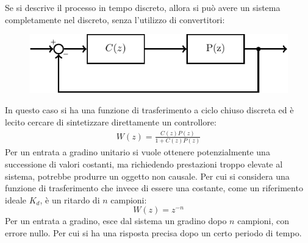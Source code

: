 \documentclass{article}
\numberwithin{equation}{subsection}
\begin{document}
Se si descrive il processo in tempo discreto, allora si può avere un sistema completamente nel discreto, senza l'utilizzo di convertitori:
\begin{figure}[H]%
    \centering
    \includegraphics{sistema-discreto-3.pdf}%
\end{figure}
In questo caso si ha una funzione di trasferimento a ciclo chiuso discreta ed è lecito cercare di sintetizzare direttamente un controllore:
\begin{gather*}
    W(z)=\displaystyle\frac{C(z)P(z)}{1+C(z)P(z)}
\end{gather*}
Per un entrata a gradino unitario si vuole ottenere potenzialmente una successione di valori costanti, ma richiedendo prestazioni troppo elevate al sistema, 
potrebbe produrre un oggetto non causale. 
Per cui si considera una funzione di trasferimento che invece di essere una costante, come un riferimento ideale $K_d$, è un ritardo di $n$ 
campioni:
\begin{equation*}
    W(z)=z^{-n}
\end{equation*}
Per un entrata a gradino, esce dal sistema un gradino dopo $n$ campioni, con errore nullo. Per cui si ha una risposta precisa dopo un certo periodo di tempo. 
\begin{figure}[H]%
    \centering
    \qquad
\end{figure}
\end{document}
